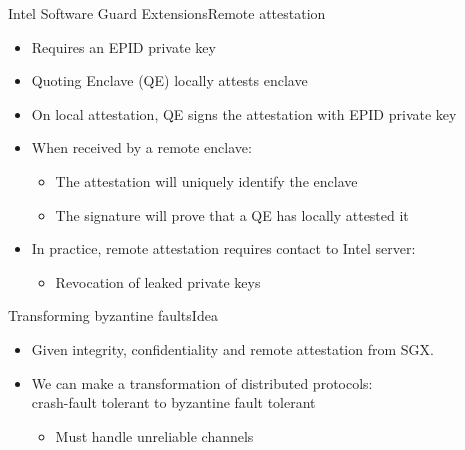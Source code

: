 \documentclass{beamer}
\begin{document}
\begin{frame}{Intel Software Guard Extensions}{Remote attestation}
	\begin{itemize}

		\vfill

		\item Requires an EPID private key

		\vfill

		\item Quoting Enclave (QE) locally attests enclave

		\vfill

		\item On local attestation, QE signs the attestation with EPID private key

		\vfill

		\item When received by a remote enclave:
    \begin{itemize}
       \item The attestation will uniquely identify the enclave
       \item The signature will prove that a QE has locally attested it
     \end{itemize}

		\vfill

		\item In practice, remote attestation requires contact to Intel server:%
    \begin{itemize}
       \item Revocation of leaked private keys
     \end{itemize} 
	\end{itemize}
\end{frame}

\begin{frame}{Transforming byzantine faults}{Idea} %
  \begin{itemize}
  	\item Given integrity, confidentiality and remote attestation from SGX.

  	\vfill

  	\item We can make a transformation of distributed protocols:\\
    crash-fault tolerant to byzantine fault tolerant
  	\begin{itemize}
  		\item Must handle unreliable channels
  	\end{itemize}
  \end{itemize}
\end{frame}
\end{document}
